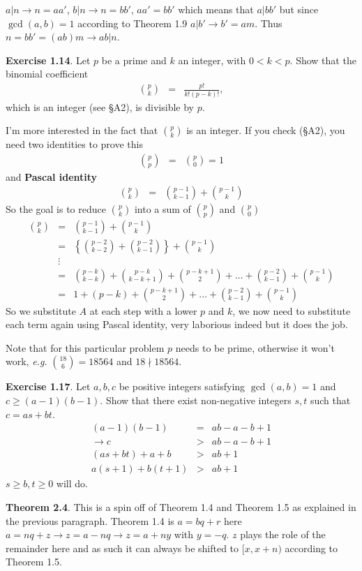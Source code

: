 \documentclass[aps,preprint,preprintnumbers,nofootinbib,showpacs,prd]{revtex4-1}
\newcommand{\eg}{{\it e.g.} }
\newcommand{\nbea}{\begin{eqnarray*}}
\newcommand{\neea}{\end{eqnarray*}}
\begin{document}
$a|n \to n = aa'$, $b|n \to n = bb'$, $aa'=bb'$ which means that $a|bb'$ but since $\gcd(a,b)=1$ according to Theorem 1.9 $a|b' \to b' = am$. Thus $n = bb' = (ab)m \to ab|n$.

{\bf Exercise 1.14}. Let $p$ be a prime and $k$ an integer, with $0 < k < p$. Show that the binomial coeﬃcient
%
\nbea
\binom{p}{k} & = & \frac{p!}{k! (p-k)!},
\neea
%
which is an integer (see \S A2), is divisible by $p$.

I'm more interested in the fact that $\binom{p}{k}$ is an integer. If you check  (\S A2), you need two identities to prove this
%
\nbea
\binom{p}{p} & = & \binom{p}{0} = 1
\neea
%
and {\bf Pascal identity}
%
\nbea
\binom{p}{k} & = & \binom{p - 1}{k - 1} + \binom{p - 1}{k}
\neea
%
So the goal is to reduce $\binom{p}{k}$ into a sum of $\binom{p}{p}$ and $\binom{p}{0}$
%
\nbea
\binom{p}{k} & = & \binom{p - 1}{k - 1} + \binom{p - 1}{k} \\
& = & \left \{ \binom{p - 2}{k - 2} + \binom{p - 2}{k - 1} \right \} + \binom{p - 1}{k} \\
& \vdots & \\
& = & \binom{p - k}{k - k} + \binom{p - k}{k - k + 1} + \binom{p - k + 1}{2} + \dots + \binom{p - 2}{k - 1} + \binom{p - 1}{k} \\
& = & 1 + (p - k) + \binom{p - k + 1}{2} + \dots + \binom{p - 2}{k - 1} + \binom{p - 1}{k}
\neea
%
So we substitute $A$ at each step with a lower $p$ and $k$, we now need to substitute each term again using Pascal identity, very laborious indeed but it does the job.

Note that for this particular problem $p$ needs to be prime, otherwise it won't work, \eg $\binom{18}{6} = 18564$ and $18 \nmid 18564$.

{\bf Exercise 1.17}.  Let $a, b, c$ be positive integers satisfying $\gcd(a, b) = 1$ and $c \ge (a - 1)(b - 1)$. Show that there exist non-negative integers $s, t$ such that $c = as + bt$.
%
\nbea
(a - 1)(b - 1) & = & ab - a - b + 1 \\
\to c & > & ab - a - b + 1 \\
(as + bt) + a + b & > & ab + 1 \\
a(s+1) + b(t + 1) & > & ab + 1
\neea
%
$s \ge b, t \ge 0$ will do.

{\bf Theorem 2.4}. This is a spin off of Theorem 1.4 and Theorem 1.5 as explained in the previous paragraph. Theorem 1.4 is $a = bq + r$ here $a = nq + z \to z = a - nq \to z = a + ny$ with $y = -q$. $z$ plays the role of the remainder here and as such it can always be shifted to $[x,x+n)$ according to Theorem 1.5.
\end{document}
